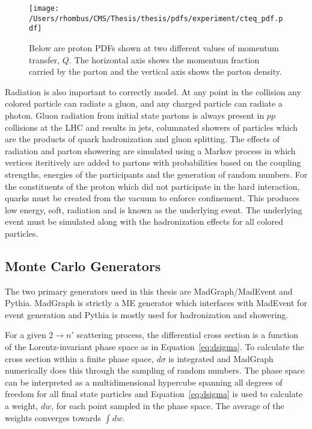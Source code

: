 \begin{figure}[tb]
 \center
 \caption[Example Parton Distribution Function from CTEQ6M]{
  Below are proton PDFs shown at two different values of
   momentum transfer, $Q$. 
  The horizontal axis shows the
   momentum fraction carried by the parton
   and the vertical axis shows the parton density.
 } 
 \texttt{[image: /Users/rhombus/CMS/Thesis/thesis/pdfs/experiment/cteq\_pdf.pdf]}
    \label{fig:cteqpdfs}
\end{figure}

 Radiation is also important to correctly model.
 At any point in the collision
  any colored particle can radiate a gluon,
  and any charged particle can radiate a photon.
 Gluon radiation from initial state partons is always present
  in $pp$ collisions at the LHC
  and results in jets, columnated showers
  of particles which are the products of quark hadronization
  and gluon splitting.
 The effects of radiation and parton showering are simulated
  using a Markov process in which 
  vertices iteritively are added to partons
  with probabilities based on the
  coupling strengths, energies of the participants
  and the generation of random numbers.
 For the constituents of the proton which
  did not participate in the hard interaction,
  quarks must be created from the vacuum
  to enforce confinement.
 This produces low energy, soft, radiation
  and is known as the underlying event.
 The underlying event must be simulated
  along with the hadronization effects for
  all colored particles.

\subsection{Monte Carlo Generators}
 The two primary generators used in this
  thesis are MadGraph/MadEvent and Pythia.
 MadGraph is strictly a ME generator
  which interfaces with MadEvent for
  event generation
  and Pythia is mostly used for hadronization 
  and showering.
  
 For a given $2\rightarrow n'$
  scattering process, the differential cross section is
  a function of the Lorentz-invariant phase space
  as in Equation~\ref{eq:dsigma}.
 To calculate the cross section within 
  a finite phase space, $d\sigma$
  is integrated and 
  MadGraph numerically does this
  through the sampling of random numbers.
 The phase space can be interpreted as a multidimensional 
  hypercube spanning all degrees of freedom
  for all final state particles
  and Equation~\ref{eq:dsigma} is used
  to calculate a weight, $dw$, for each point
  sampled in the phase space.
 The average
  of the weights converges towards $\int dw$.


